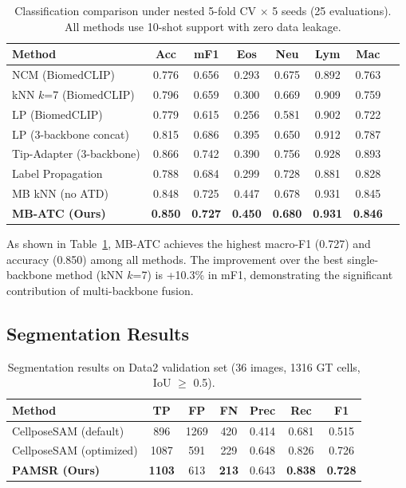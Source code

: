 \documentclass[preprint,review,12pt]{elsarticle}
\begin{document}
\begin{table}[htbp]
\centering
\caption{Classification comparison under nested 5-fold CV $\times$ 5 seeds (25 evaluations). All methods use 10-shot support with zero data leakage.}
\label{tab:classification}
\begin{tabular}{lccccccc}
\toprule
\textbf{Method} & \textbf{Acc} & \textbf{mF1} & \textbf{Eos} & \textbf{Neu} & \textbf{Lym} & \textbf{Mac} \\
\midrule
NCM (BiomedCLIP) & 0.776 & 0.656 & 0.293 & 0.675 & 0.892 & 0.763 \\
kNN $k$=7 (BiomedCLIP) & 0.796 & 0.659 & 0.300 & 0.669 & 0.909 & 0.759 \\
LP (BiomedCLIP) & 0.779 & 0.615 & 0.256 & 0.581 & 0.902 & 0.722 \\
LP (3-backbone concat) & 0.815 & 0.686 & 0.395 & 0.650 & 0.912 & 0.787 \\
Tip-Adapter (3-backbone) & 0.866 & 0.742 & 0.390 & 0.756 & 0.928 & 0.893 \\
Label Propagation & 0.788 & 0.684 & 0.299 & 0.728 & 0.881 & 0.828 \\
MB kNN (no ATD) & 0.848 & 0.725 & 0.447 & 0.678 & 0.931 & 0.845 \\
\midrule
\textbf{MB-ATC (Ours)} & \textbf{0.850} & \textbf{0.727} & \textbf{0.450} & \textbf{0.680} & \textbf{0.931} & \textbf{0.846} \\
\bottomrule
\end{tabular}
\end{table}

As shown in Table~\ref{tab:classification}, MB-ATC achieves the highest macro-F1 (0.727) and accuracy (0.850) among all methods. The improvement over the best single-backbone method (kNN $k$=7) is +10.3\% in mF1, demonstrating the significant contribution of multi-backbone fusion.

\subsection{Segmentation Results}

\begin{table}[htbp]
\centering
\caption{Segmentation results on Data2 validation set (36 images, 1316 GT cells, IoU $\geq$ 0.5).}
\label{tab:segmentation}
\begin{tabular}{lcccccc}
\toprule
\textbf{Method} & \textbf{TP} & \textbf{FP} & \textbf{FN} & \textbf{Prec} & \textbf{Rec} & \textbf{F1} \\
\midrule
CellposeSAM (default) & 896 & 1269 & 420 & 0.414 & 0.681 & 0.515 \\
CellposeSAM (optimized) & 1087 & 591 & 229 & 0.648 & 0.826 & 0.726 \\
\textbf{PAMSR (Ours)} & \textbf{1103} & 613 & \textbf{213} & 0.643 & \textbf{0.838} & \textbf{0.728} \\
\bottomrule
\end{tabular}
\end{table}
\end{document}
